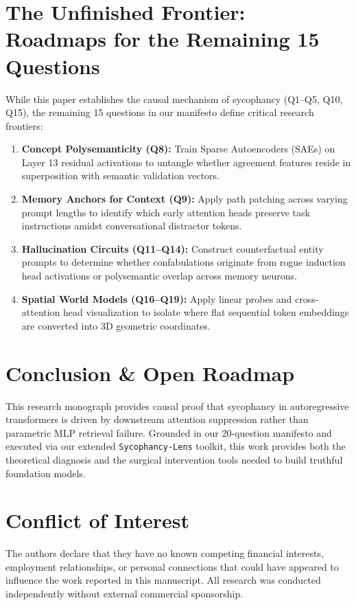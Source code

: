 \documentclass[journal,10pt,twocolumn]{IEEEtran}
\begin{document}
\section{The Unfinished Frontier: Roadmaps for the Remaining 15 Questions}
\label{sec:frontier}
While this paper establishes the causal mechanism of sycophancy (Q1--Q5, Q10, Q15), the remaining 15 questions in our manifesto define critical research frontiers:
\begin{enumerate}
    \item \textbf{Concept Polysemanticity (Q8):} Train Sparse Autoencoders (SAEs) on Layer 13 residual activations to untangle whether agreement features reside in superposition with semantic validation vectors.
    \item \textbf{Memory Anchors for Context (Q9):} Apply path patching across varying prompt lengths to identify which early attention heads preserve task instructions amidst conversational distractor tokens.
    \item \textbf{Hallucination Circuits (Q11--Q14):} Construct counterfactual entity prompts to determine whether confabulations originate from rogue induction head activations or polysemantic overlap across memory neurons.
    \item \textbf{Spatial World Models (Q16--Q19):} Apply linear probes and cross-attention head visualization to isolate where flat sequential token embeddings are converted into 3D geometric coordinates.
\end{enumerate}

\section{Conclusion \& Open Roadmap}
This research monograph provides causal proof that sycophancy in autoregressive transformers is driven by downstream attention suppression rather than parametric MLP retrieval failure. Grounded in our 20-question manifesto and executed via our extended \texttt{Sycophancy-Lens} toolkit, this work provides both the theoretical diagnosis and the surgical intervention tools needed to build truthful foundation models.

\section*{Conflict of Interest}
The authors declare that they have no known competing financial interests, employment relationships, or personal connections that could have appeared to influence the work reported in this manuscript. All research was conducted independently without external commercial sponsorship.
\end{document}
